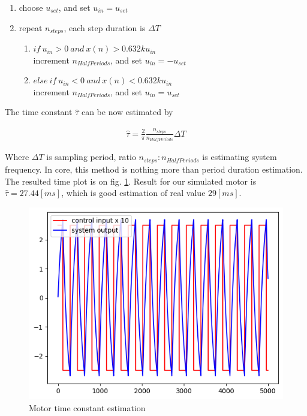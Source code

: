\documentclass[12pt,twoside,onecolumn,openany,extrafontsizes,dvipsnames]{memoir}
\begin{document}
            \begin{enumerate}
                \item choose $u_{set}$, and set $u_{in} = u_{set}$
                \item repeat $n_{steps}$, each step duration is $\Delta T$
                    \begin{enumerate}
                        \item $if\ u_{in} > 0\ and\ x(n) > 0.632ku_{in}$ \\
                            increment $n_{HalfPeriods}$, and set $u_{in} = -u_{set}$
                        \item $else\ if\ u_{in} < 0\ and\ x(n) < 0.632ku_{in}$ \\
                            increment $n_{HalfPeriods}$, and set $u_{in} = u_{set}$
                    \end{enumerate}
            \end{enumerate}

            The time constant $\hat{\tau}$ can be now estimated by 

            \begin{align}   
                \hat{\tau} = \frac{2}{\pi}\frac{n_{steps}}{n_{HalfPeriods}}{\Delta T}
            \end{align}

            Where $\Delta T$ is sampling period, ratio ${n_{steps}} : {n_{HalfPeriods}}$ is
            estimating system frequency. In core, this method is nothing more than  period 
            duration estimation. The resulted time plot is on fig.  \ref{fig:motor_time_constant_estimation}.
            Result for our simulated motor is $\hat{\tau} = 27.44[ms]$, which is good estimation of real value $29 [ms]$.

            \begin{figure}[!htb]
                \centering
                \includegraphics[scale=0.6]{../images/motor_control/motor_time_constant_estimation.png}
                \caption{Motor time constant estimation}
                \label{fig:motor_time_constant_estimation}
            \end{figure}
            
\end{document}
